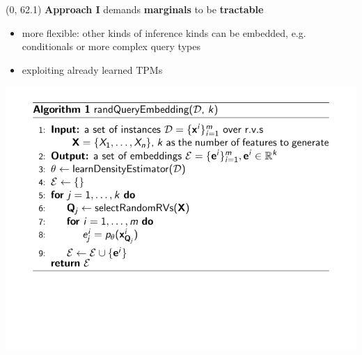 \documentclass[final]{beamer}
\begin{document}
\begin{frame}{}
  \begin{textblock}{25.2}(0, 62.1)
    \small
    \textbf{Approach I} demands \textbf{marginals} to be \textbf{tractable}
    \begin{itemize}
    \item more flexible: other kinds of inference kinds can be embedded,
      e.g. conditionals or more complex query
      types~\parencite{Bekker2015}
      \item exploiting already learned TPMs
    \end{itemize}
    \vspace{4pt}
    \begin{center}
      \includegraphics[width=0.9\linewidth]{algo_I}
    \end{center}

      


\end{textblock}
\end{frame}
\end{document}
